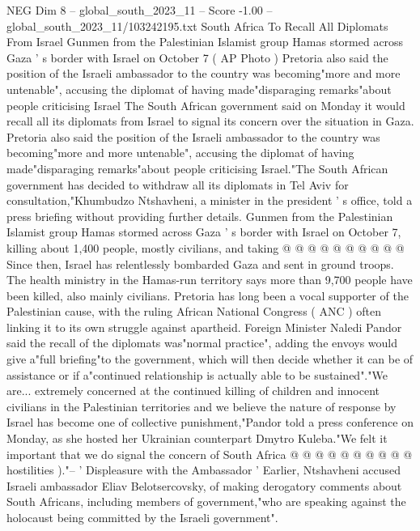 \begin{textsample}{NEG Dim 8 – global\_south\_2023\_11 – Score -1.00 – global\_south\_2023\_11/103242195.txt}  \label{ex:f8_neg_087}
South Africa To Recall All Diplomats From Israel Gunmen from the Palestinian Islamist group Hamas stormed across Gaza ' s border with Israel on October 7 ( AP Photo ) Pretoria also said the position of the Israeli ambassador to the country was becoming"more and more untenable", accusing the diplomat of having made"disparaging remarks"about people criticising Israel The South African government said on Monday it would recall all its diplomats from Israel to signal its concern over the situation in Gaza.
Pretoria also said the position of the Israeli ambassador to the country was becoming"more and more untenable", accusing the diplomat of having made"disparaging remarks"about people criticising Israel."The South African government has decided to withdraw all its diplomats in Tel Aviv for consultation,"Khumbudzo Ntshavheni, a minister in the president ' s office, told a press briefing without providing further details.
Gunmen from the Palestinian Islamist group Hamas stormed across Gaza ' s border with Israel on October 7, killing about 1,400 people, mostly civilians, and taking @ @ @ @ @ @ @ @ @ @ Since then, Israel has relentlessly bombarded Gaza and sent in ground troops.
The health ministry in the Hamas-run territory says more than 9,700 people have been killed, also mainly civilians.
Pretoria has long been a vocal supporter of the Palestinian cause, with the ruling African National Congress ( ANC ) often linking it to its own struggle against apartheid.
Foreign Minister Naledi Pandor said the recall of the diplomats was"normal practice", adding the envoys would give a"full briefing"to the government, which will then decide whether it can be of assistance or if a"continued relationship is actually able to be sustained"."We are... extremely concerned at the continued killing of children and innocent civilians in the Palestinian territories and we believe the nature of response by Israel has become one of collective punishment,"Pandor told a press conference on Monday, as she hosted her Ukrainian counterpart Dmytro Kuleba."We felt it important that we do signal the concern of South Africa @ @ @ @ @ @ @ @ @ @ hostilities )."-- ' Displeasure with the Ambassador ' Earlier, Ntshavheni accused Israeli ambassador Eliav Belotsercovsky, of making derogatory comments about South Africans, including members of government,"who are speaking against the holocaust being committed by the Israeli government".

\end{textsample}
